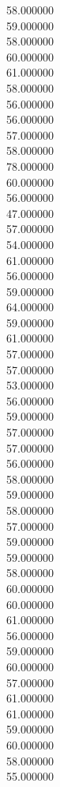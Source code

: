 58.000000\\
59.000000\\
58.000000\\
60.000000\\
61.000000\\
58.000000\\
56.000000\\
56.000000\\
57.000000\\
58.000000\\
78.000000\\
60.000000\\
56.000000\\
47.000000\\
57.000000\\
54.000000\\
61.000000\\
56.000000\\
59.000000\\
64.000000\\
59.000000\\
61.000000\\
57.000000\\
57.000000\\
53.000000\\
56.000000\\
59.000000\\
57.000000\\
57.000000\\
56.000000\\
58.000000\\
59.000000\\
58.000000\\
57.000000\\
59.000000\\
59.000000\\
58.000000\\
60.000000\\
60.000000\\
61.000000\\
56.000000\\
59.000000\\
60.000000\\
57.000000\\
61.000000\\
61.000000\\
59.000000\\
60.000000\\
58.000000\\
55.000000\\
